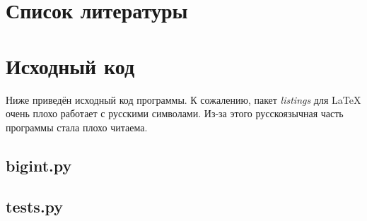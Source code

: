 \clearpage

\section{Список литературы}

\nocite{*}

\printbibliography[heading=none]

\clearpage

\section{Исходный код}

Ниже приведён исходный код программы. К сожалению, пакет \textit{listings} для \LaTeX{} очень плохо работает с
русскими символами. Из-за этого русскоязычная часть программы стала плохо читаема.

\subsection{bigint.py}

\clearpage

\subsection{tests.py}

\clearpage
